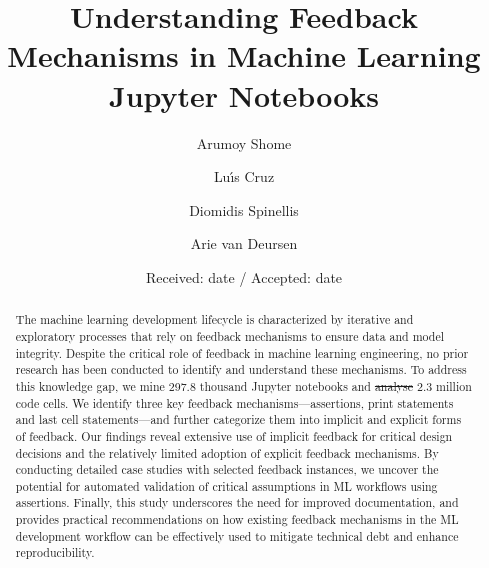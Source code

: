 \documentclass[smallextended]{svjour3}       %
\providecommand{\DIFadd}[1]{{\protect\color{blue}\uwave{#1}}} %
\providecommand{\DIFdel}[1]{{\protect\color{red}\sout{#1}}} %
\providecommand{\DIFaddbegin}{} %
\providecommand{\DIFaddend}{} %
\providecommand{\DIFdelbegin}{} %
\providecommand{\DIFdelend}{} %
\newcommand{\DIFscaledelfig}{0.5}
\newlength{\DIFdelgraphicswidth} %
\newlength{\DIFdelgraphicsheight} %
\newcommand{\DIFaddincludegraphics}[2][]{{\color{blue}\fbox{\DIFOincludegraphics[#1]{#2}}}} %
\newcommand{\DIFdelincludegraphics}[2][]{%
\sbox{\DIFdelgraphicsbox}{\DIFOincludegraphics[#1]{#2}}%
\settoboxwidth{\DIFdelgraphicswidth}{\DIFdelgraphicsbox} %
\settoboxtotalheight{\DIFdelgraphicsheight}{\DIFdelgraphicsbox} %
\scalebox{\DIFscaledelfig}{%
\parbox[b]{\DIFdelgraphicswidth}{\usebox{\DIFdelgraphicsbox}\\[-\baselineskip] \rule{\DIFdelgraphicswidth}{0em}}\llap{\resizebox{\DIFdelgraphicswidth}{\DIFdelgraphicsheight}{%
\setlength{\unitlength}{\DIFdelgraphicswidth}%
\begin{picture}(1,1)%
\thicklines\linethickness{2pt} %
{\color[rgb]{1,0,0}\put(0,0){\framebox(1,1){}}}%
{\color[rgb]{1,0,0}\put(0,0){\line( 1,1){1}}}%
{\color[rgb]{1,0,0}\put(0,1){\line(1,-1){1}}}%
\end{picture}%
}\hspace*{3pt}}} %
} %
\DeclareRobustCommand{\DIFaddbegin}{\DIFOaddbegin \let\includegraphics\DIFaddincludegraphics} %
\DeclareRobustCommand{\DIFaddend}{\DIFOaddend \let\includegraphics\DIFOincludegraphics} %
\DeclareRobustCommand{\DIFdelbegin}{\DIFOdelbegin \let\includegraphics\DIFdelincludegraphics} %
\DeclareRobustCommand{\DIFdelend}{\DIFOaddend \let\includegraphics\DIFOincludegraphics} %
\begin{document}
\title{Understanding Feedback Mechanisms in Machine Learning Jupyter Notebooks}


\author{Arumoy Shome\and
	Lu{\'\i}s Cruz\and
	Diomidis Spinellis\and
	Arie van Deursen
}



\date{Received: date / Accepted: date}


\maketitle

\begin{abstract}
	The machine learning development lifecycle is characterized by iterative and exploratory processes that rely on feedback mechanisms to ensure data and model integrity. Despite the critical role of feedback in machine learning engineering, no prior research has been conducted to identify and understand these mechanisms. To address this knowledge gap, we mine 297.8 thousand Jupyter notebooks and \DIFdelbegin \DIFdel{analyse }\DIFdelend \DIFaddbegin \DIFadd{analyze }\DIFaddend 2.3 million code cells. We identify three key feedback mechanisms---assertions, print statements and last cell statements---and further categorize them into implicit and explicit forms of feedback. Our findings reveal extensive use of implicit feedback for critical design decisions and the relatively limited adoption of explicit feedback mechanisms. By conducting detailed case studies with selected feedback instances, we uncover the potential for automated validation of critical assumptions in ML workflows using assertions. Finally, this study underscores the need for improved documentation, and provides practical recommendations on how existing feedback mechanisms in the ML development workflow can be effectively used to mitigate technical debt and enhance reproducibility.
\end{abstract}
\end{document}
